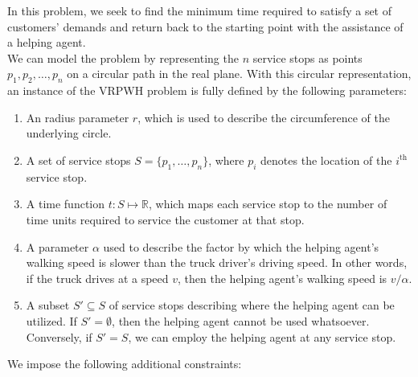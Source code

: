 \documentclass[12pt]{scrartcl}
\begin{document}
In this problem, we seek to find the minimum time required to satisfy a set of customers' demands and return back to the starting point with the assistance of a helping agent. \\

\noindent We can model the problem by representing the $n$ service stops as points $p_1, p_2, \ldots, p_n$ on a circular path in the real plane. With this circular representation, an instance of the VRPWH problem is fully defined by the following parameters:

\begin{enumerate}
    \item An radius parameter $r$, which is used to describe the circumference of the underlying circle.
    \item A set of service stops $S = \{p_1, \ldots, p_n\}$, where $p_i$ denotes the location of the $i^{\text{th}}$ service stop.
    \item A time function $t : S \mapsto \mathbb{R}$, which maps each service stop to the number of time units required to service the customer at that stop.
    \item A parameter $\alpha$ used to describe the factor by which the helping agent's walking speed is slower than the truck driver's driving speed. In other words, if the truck drives at a speed $v$, then the helping agent's walking speed is $v/\alpha$.
    \item A subset $S' \subseteq S$ of service stops describing where the helping agent can be utilized. If $S' = \emptyset$, then the helping agent cannot be used whatsoever. Conversely, if $S' = S$, we can employ the helping agent at any service stop. 
\end{enumerate}


We impose the following additional constraints: 
\end{document}

